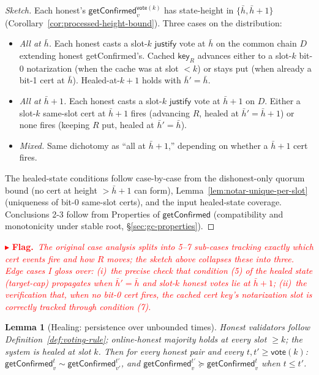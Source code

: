 \documentclass{article}
\newcommand{\just}{\ensuremath{\mathsf{justify}}\xspace}
\newcommand{\key}{\mathsf{key}}
\newcommand{\vote}{\mathsf{vote}}
\newcommand{\OHM}{online-honest majority\xspace}
\newcommand{\getConfirmed}{\textsf{getConfirmed}\xspace}
\newcommand{\comm}[1]{\bar{#1}}
\newcommand{\flag}[1]{%
  \par\smallskip\noindent\textcolor{red}{$\blacktriangleright$ \textbf{Flag.}~\textit{#1}}\par\smallskip}
\theoremstyle{plain}
\newtheorem{lemma}[theorem]{Lemma}
\theoremstyle{definition}
\theoremstyle{remark}
\begin{document}
\begin{proof}[Sketch]
Each honest's $\getConfirmed_v^{\vote(k)}$ has state-height in $\{\comm{h}, \comm{h}+1\}$ (Corollary~\ref{cor:processed-height-bound}). Three cases on the distribution:
\begin{itemize}
\item \emph{All at $\comm{h}$.} Each honest casts a slot-$k$ \just{} vote at $\comm{h}$ on the common chain $D$ extending honest \getConfirmed{}'s. Cached $\key_R$ advances either to a slot-$k$ bit-0 notarization (when the cache was at slot $<k$) or stays put (when already a bit-1 cert at $\comm{h}$). Healed-at-$k+1$ holds with $\comm{h}' = \comm{h}$.
\item \emph{All at $\comm{h}+1$.} Each honest casts a slot-$k$ \just{} vote at $\comm{h}+1$ on $D$. Either a slot-$k$ same-slot cert at $\comm{h}+1$ fires (advancing $R$, healed at $\comm{h}' = \comm{h}+1$) or none fires (keeping $R$ put, healed at $\comm{h}' = \comm{h}$).
\item \emph{Mixed.} Same dichotomy as ``all at $\comm{h}+1$,'' depending on whether a $\comm{h}+1$ cert fires.
\end{itemize}
The healed-state conditions follow case-by-case from the dishonest-only quorum bound (no cert at height $> \comm{h}+1$ can form), Lemma~\ref{lem:notar-unique-per-slot} (uniqueness of bit-0 same-slot certs), and the input healed-state coverage. Conclusions 2-3 follow from Properties of $\getConfirmed$ (compatibility and monotonicity under stable root, \S\ref{sec:gc-properties}).
\end{proof}

\flag{The original case analysis splits into 5--7 sub-cases tracking exactly which cert events fire and how $R$ moves; the sketch above collapses these into three. Edge cases I gloss over: (i)~the precise check that condition (5) of the healed state (target-cap) propagates when $\comm{h}' = \comm{h}$ and slot-$k$ honest votes lie at $\comm{h}+1$; (ii)~the verification that, when no bit-0 cert fires, the cached cert key's notarization slot is correctly tracked through condition (7).}

\begin{lemma}[Healing: persistence over unbounded times]\label{lem:healing-unbounded}
Honest validators follow Definition~\ref{def:voting-rule}; \OHM holds at every slot $\geq k$; the system is healed at slot $k$. Then for every honest pair and every $t, t' \geq \vote(k)$: $\getConfirmed_v^t \sim \getConfirmed_{v'}^{t'}$, and $\getConfirmed_v^{t'} \succeq \getConfirmed_v^t$ when $t \leq t'$.
\end{lemma}
\end{document}
